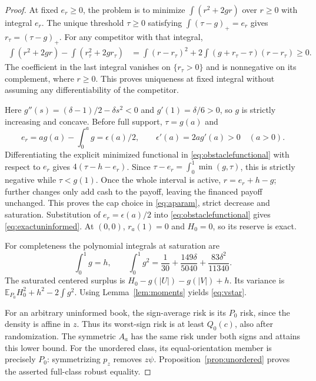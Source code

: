 \documentclass[11pt,a4paper]{amsart}
\theoremstyle{plain}
\theoremstyle{definition}
\theoremstyle{remark}
\newcommand{\EE}{\mathbb{E}}
\begin{document}
\begin{proof}
At fixed $e_r\ge0$, the problem is to minimize $\int(r^2+2gr)$ over $r\ge0$ with integral $e_r$. The unique threshold $\tau\ge0$ satisfying $\int(\tau-g)_+=e_r$ gives $r_\tau=(\tau-g)_+$. For any competitor with that integral,
\begin{align*}
 \int(r^2+2gr)-\int(r_\tau^2+2gr_\tau)
 &=\int(r-r_\tau)^2
 +2\int(g+r_\tau-\tau)(r-r_\tau)\ge0.
\end{align*}
The coefficient in the last integral vanishes on $\{r_\tau>0\}$ and is nonnegative on its complement, where $r\ge0$. This proves uniqueness at fixed integral without assuming any differentiability of the competitor.

Here $g''(s)=(\delta-1)/2-\delta s^2<0$ and $g'(1)=\delta/6>0$, so $g$ is strictly increasing and concave. Before full support, $\tau=g(a)$ and
\[
 e_r=a g(a)-\int_0^a g=\epsilon(a)/2,\qquad
 \epsilon'(a)=2a g'(a)>0\quad(a>0).
\]
Differentiating the explicit minimized functional in \eqref{eq:obstaclefunctional} with respect to $e_r$ gives $4(\tau-h-e_r)$. Since
$\tau-e_r=\int_0^1\min(g,\tau)$, this is strictly negative while $\tau<g(1)$. Once the whole interval is active, $r=e_r+h-g$; further changes only add cash to the payoff, leaving the financed payoff unchanged. This proves the cap choice in \eqref{eq:aparam}, strict decrease and saturation. Substitution of $e_r=\epsilon(a)/2$ into \eqref{eq:obstaclefunctional} gives \eqref{eq:exactuninformed}. At $(0,0)$, $r_a(1)=0$ and $H_0=0$, so its reserve is exact.

For completeness the polynomial integrals at saturation are
\[
 \int_0^1g=h,\qquad
 \int_0^1g^2=\frac1{30}+\frac{149\delta}{5040}
                   +\frac{83\delta^2}{11340}.
\]
The saturated centered surplus is $H_0-g(|U|)-g(|V|)+h$. Its variance is
$\EE_{P_0}H_0^2+h^2-2\int g^2$. Using Lemma~\ref{lem:moments} yields \eqref{eq:vstar}.

For an arbitrary uninformed book, the sign-average risk is its $P_0$ risk, since the density is affine in $z$. Thus its worst-sign risk is at least $Q_0(c)$, also after randomization. The symmetric $A_a$ has the same risk under both signs and attains this lower bound. For the unordered class, its equal-orientation member is precisely $P_0$: symmetrizing $p_z$ removes $z\psi$. Proposition~\ref{prop:unordered} proves the asserted full-class robust equality.
\end{proof}
\end{document}
